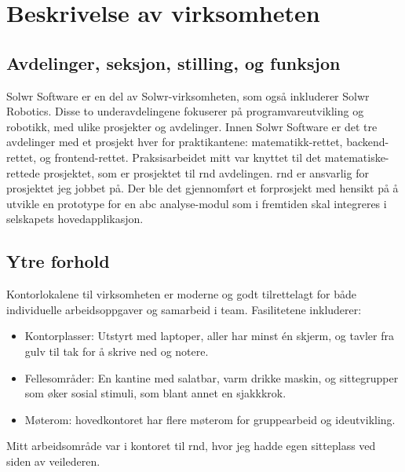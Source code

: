 \section{Beskrivelse av virksomheten}

\subsection{Avdelinger, seksjon, stilling, og funksjon}
Solwr Software er en del av Solwr-virksomheten, som også inkluderer Solwr Robotics. Disse to underavdelingene fokuserer på programvareutvikling og robotikk, med ulike prosjekter og avdelinger. Innen Solwr Software er det tre avdelinger med et prosjekt hver for praktikantene: matematikk-rettet, backend-rettet, og frontend-rettet. Praksisarbeidet mitt var knyttet til det matematiske-rettede prosjektet, som er prosjektet til \gls{rnd} avdelingen. \Gls{rnd} er ansvarlig for prosjektet jeg jobbet på. Der ble det gjennomført et forprosjekt med hensikt på å utvikle en prototype for en \gls{abc} analyse-modul som i fremtiden skal integreres i selskapets hovedapplikasjon.

\subsection{Ytre forhold}
Kontorlokalene til virksomheten er moderne og godt tilrettelagt for både individuelle arbeidsoppgaver og samarbeid i team. Fasilitetene inkluderer:

\begin{itemize}
    \item Kontorplasser: Utstyrt med laptoper, aller har minst én skjerm, og tavler fra gulv til tak for å skrive ned og notere.
    \item Fellesområder: En kantine med salatbar, varm drikke maskin, og sittegrupper som øker sosial stimuli, som blant annet en sjakkkrok.
    \item Møterom: hovedkontoret har flere møterom for gruppearbeid og ideutvikling.
\end{itemize}

Mitt arbeidsområde var i kontoret til \gls{rnd}, hvor jeg hadde egen sitteplass ved siden av veilederen.

